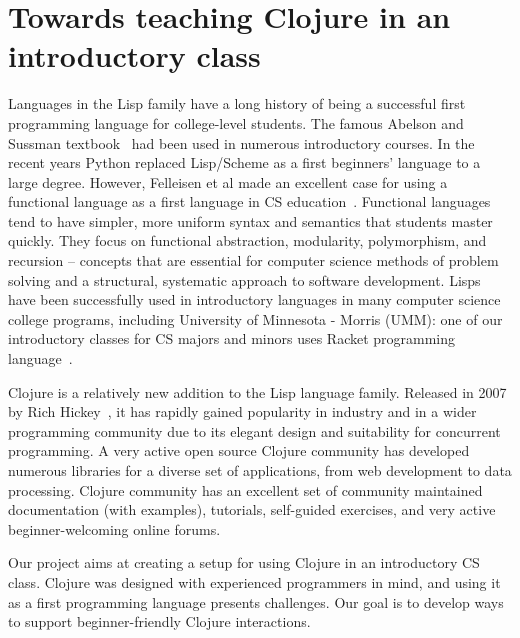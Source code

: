 \documentclass[submission,copyright,creativecommons]{eptcs}
\newcommand{\allcomments}[1]{{#1}}
\newcommand{\emcomment}[1]{{\bf \textcolor{ForestGreen}{\allcomments{{#1}}}}}
\begin{document}
\section{Towards teaching Clojure in an introductory class}\label{sec:project}
Languages in the Lisp family have a long history of being a successful first programming language for college-level students.
The famous Abelson and Sussman textbook~\cite{Abelson} had been used in numerous introductory courses.
In the recent years Python replaced Lisp/Scheme as a first beginners' language to a large degree. However, 
Felleisen et al made an excellent case for using a functional language as a first language in  CS education~\cite{Felleisen:2004}.   
Functional languages tend to have simpler, more uniform syntax and semantics that students master quickly.
They focus on functional abstraction, modularity, polymorphism, and recursion -- concepts that are essential for computer science methods of 
problem solving and a structural, systematic approach to software development. 
Lisps have been successfully used in introductory languages in many computer science college programs, including University of Minnesota - Morris (UMM): 
one of our introductory classes for CS majors and minors uses Racket programming language~\cite{htdp,htdp2}. 

Clojure is a relatively new addition to the Lisp language family. Released in 2007 by Rich Hickey~\cite{Hickey:2008}, it has rapidly gained popularity in industry
and in a wider programming community 
due to its elegant design and suitability for concurrent programming. A very active open source Clojure community has developed numerous 
libraries for a diverse set of applications, from web development to data processing. 
Clojure community has an excellent set of community maintained documentation (with examples), tutorials, 
self-guided exercises, and very active beginner-welcoming online forums.

Our project aims at creating a setup for using Clojure in an introductory CS class. Clojure was designed with experienced programmers in mind, 
and using it as a first programming language presents challenges. Our goal is to develop ways to support beginner-friendly Clojure interactions. 
\end{document}
